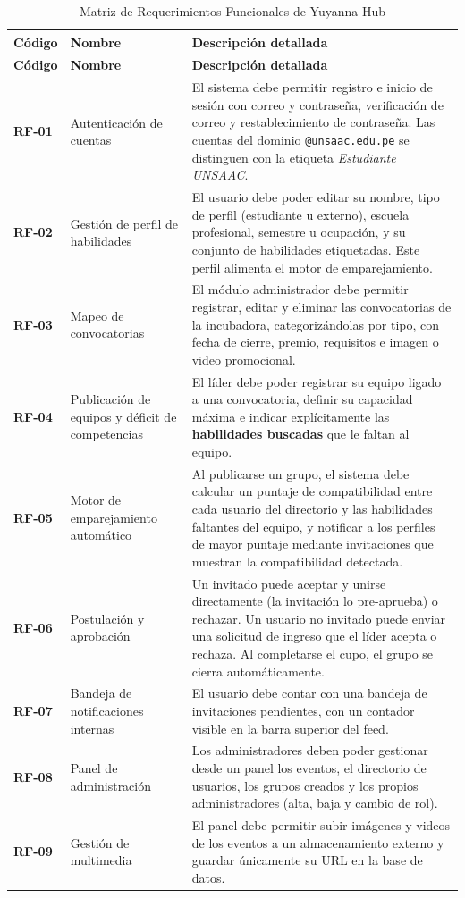 \documentclass[12pt,a4paper]{article}
\begin{document}
\begin{longtable}{L{1.5cm}L{3.7cm}L{8.4cm}}
\caption{Matriz de Requerimientos Funcionales de Yuyanna Hub}\label{tab:rf}\\
\toprule
\textbf{Código} & \textbf{Nombre} & \textbf{Descripción detallada} \\
\midrule
\endfirsthead
\toprule
\textbf{Código} & \textbf{Nombre} & \textbf{Descripción detallada} \\
\midrule
\endhead
\bottomrule
\endfoot
\textbf{RF-01} & Autenticación de cuentas & El sistema debe permitir registro e inicio de sesión con correo y contraseña, verificación de correo y restablecimiento de contraseña. Las cuentas del dominio \texttt{@unsaac.edu.pe} se distinguen con la etiqueta \emph{Estudiante UNSAAC}. \\
\textbf{RF-02} & Gestión de perfil de habilidades & El usuario debe poder editar su nombre, tipo de perfil (estudiante u externo), escuela profesional, semestre u ocupación, y su conjunto de habilidades etiquetadas. Este perfil alimenta el motor de emparejamiento. \\
\textbf{RF-03} & Mapeo de convocatorias & El módulo administrador debe permitir registrar, editar y eliminar las convocatorias de la incubadora, categorizándolas por tipo, con fecha de cierre, premio, requisitos e imagen o video promocional. \\
\textbf{RF-04} & Publicación de equipos y déficit de competencias & El líder debe poder registrar su equipo ligado a una convocatoria, definir su capacidad máxima e indicar explícitamente las \textbf{habilidades buscadas} que le faltan al equipo. \\
\textbf{RF-05} & Motor de emparejamiento automático & Al publicarse un grupo, el sistema debe calcular un puntaje de compatibilidad entre cada usuario del directorio y las habilidades faltantes del equipo, y notificar a los perfiles de mayor puntaje mediante invitaciones que muestran la compatibilidad detectada. \\
\textbf{RF-06} & Postulación y aprobación & Un invitado puede aceptar y unirse directamente (la invitación lo pre-aprueba) o rechazar. Un usuario no invitado puede enviar una solicitud de ingreso que el líder acepta o rechaza. Al completarse el cupo, el grupo se cierra automáticamente. \\
\textbf{RF-07} & Bandeja de notificaciones internas & El usuario debe contar con una bandeja de invitaciones pendientes, con un contador visible en la barra superior del feed. \\
\textbf{RF-08} & Panel de administración & Los administradores deben poder gestionar desde un panel los eventos, el directorio de usuarios, los grupos creados y los propios administradores (alta, baja y cambio de rol). \\
\textbf{RF-09} & Gestión de multimedia & El panel debe permitir subir imágenes y videos de los eventos a un almacenamiento externo y guardar únicamente su URL en la base de datos. \\
\end{longtable}
\end{document}
